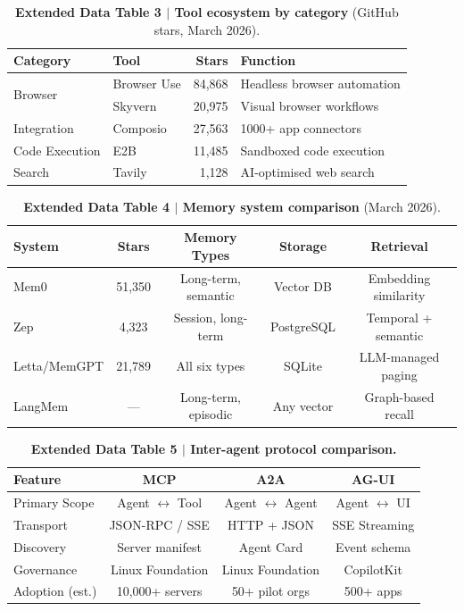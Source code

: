 \documentclass[10pt]{article}
\begin{document}
\begin{table}[ht]
\centering
\caption*{\textbf{Extended Data Table 3 $|$ Tool ecosystem by category} (GitHub stars, March 2026).}
\begin{tabular}{llrl}
\toprule
\textbf{Category} & \textbf{Tool} & \textbf{Stars} & \textbf{Function} \\
\midrule
\multirow{2}{*}{Browser}     & Browser Use & 84,868 & Headless browser automation \\
                              & Skyvern     & 20,975 & Visual browser workflows \\
Integration                   & Composio    & 27,563 & 1000+ app connectors \\
Code Execution                & E2B         & 11,485 & Sandboxed code execution \\
Search                        & Tavily      & 1,128  & AI-optimised web search \\
\bottomrule
\end{tabular}
\end{table}

\begin{table}[ht]
\centering
\caption*{\textbf{Extended Data Table 4 $|$ Memory system comparison} (March 2026).}
\begin{tabular}{lcccc}
\toprule
\textbf{System} & \textbf{Stars} & \textbf{Memory Types} & \textbf{Storage} & \textbf{Retrieval} \\
\midrule
Mem0         & 51,350 & Long-term, semantic  & Vector DB  & Embedding similarity \\
Zep          & 4,323  & Session, long-term   & PostgreSQL & Temporal + semantic \\
Letta/MemGPT & 21,789 & All six types        & SQLite     & LLM-managed paging \\
LangMem      & ---    & Long-term, episodic  & Any vector & Graph-based recall \\
\bottomrule
\end{tabular}
\end{table}

\begin{table}[ht]
\centering
\caption*{\textbf{Extended Data Table 5 $|$ Inter-agent protocol comparison.}}
\begin{tabular}{lccc}
\toprule
\textbf{Feature} & \textbf{MCP} & \textbf{A2A} & \textbf{AG-UI} \\
\midrule
Primary Scope        & Agent $\leftrightarrow$ Tool & Agent $\leftrightarrow$ Agent & Agent $\leftrightarrow$ UI \\
Transport            & JSON-RPC / SSE               & HTTP + JSON                   & SSE Streaming \\
Discovery            & Server manifest              & Agent Card                    & Event schema \\
Governance           & Linux Foundation             & Linux Foundation              & CopilotKit \\
Adoption (est.)      & 10,000+ servers              & 50+ pilot orgs                & 500+ apps \\
\bottomrule
\end{tabular}
\end{table}
\end{document}
